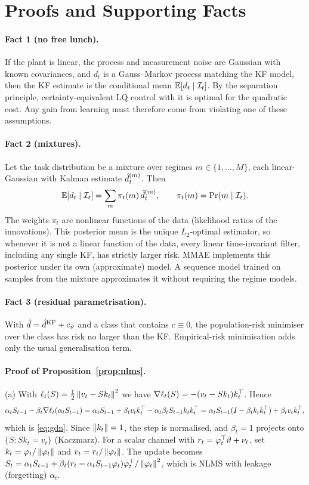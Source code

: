 \section{Proofs and Supporting Facts}
\label{app:proofs}

\paragraph{Fact 1 (no free lunch).}
If the plant is linear, the process and measurement noise are Gaussian with known covariances, and $d_t$ is a Gauss--Markov process matching the KF model, then the KF estimate is the conditional mean $\mathbb{E}[d_t\mid\mathcal{I}_t]$. By the separation principle, certainty-equivalent LQ control with it is optimal for the quadratic cost. Any gain from learning must therefore come from violating one of these assumptions.

\paragraph{Fact 2 (mixtures).}
Let the task distribution be a mixture over regimes $m\in\{1,\dots,M\}$, each linear-Gaussian with Kalman estimate $\hat d^{(m)}_t$. Then
\[
  \mathbb{E}[d_t\mid\mathcal{I}_t]=\sum_m \pi_t(m)\,\hat d^{(m)}_t,\qquad \pi_t(m)=\Pr(m\mid\mathcal{I}_t).
\]
The weights $\pi_t$ are nonlinear functions of the data (likelihood ratios of the innovations). This posterior mean is the unique $L_2$-optimal estimator, so whenever it is not a linear function of the data, every linear time-invariant filter, including any single KF, has strictly larger risk. MMAE implements this posterior under its own (approximate) model. A sequence model trained on samples from the mixture approximates it without requiring the regime models.

\paragraph{Fact 3 (residual parametrisation).}
With $\hat d=\hat d^{\mathrm{KF}}+c_\vartheta$ and a class that contains $c\equiv0$, the population-risk minimiser over the class has risk no larger than the KF. Empirical-risk minimisation adds only the usual generalisation term.

\paragraph{Proof of Proposition~\ref{prop:nlms}.}
(a) With $\ell_t(S)=\frac12\left\lVert v_t-Sk_t \right\rVert^2$ we have $\nabla\ell_t(S)=-(v_t-Sk_t)k_t^{\top}$. Hence
\[
\alpha_tS_{t-1}-\beta_t\nabla\ell_t(\alpha_tS_{t-1})=\alpha_tS_{t-1}+\beta_tv_tk_t^{\top}-\alpha_t\beta_tS_{t-1}k_tk_t^{\top}=\alpha_tS_{t-1}(I-\beta_tk_tk_t^{\top})+\beta_tv_tk_t^{\top},
\]
which is \eqref{eq:gdn}. Since $\left\lVert k_t \right\rVert=1$, the step is normalised, and $\beta_t=1$ projects onto $\{S:Sk_t=v_t\}$ (Kaczmarz).
For a scalar channel with $r_t=\varphi_t^{\top}\vartheta+\nu_t$, set $k_t=\varphi_t/\left\lVert \varphi_t \right\rVert$ and $v_t=r_t/\left\lVert \varphi_t \right\rVert$. The update becomes $S_t=\alpha_tS_{t-1}+\beta_t(r_t-\alpha_tS_{t-1}\varphi_t)\varphi_t^{\top}/\left\lVert \varphi_t \right\rVert^2$, which is NLMS with leakage (forgetting) $\alpha_t$.


